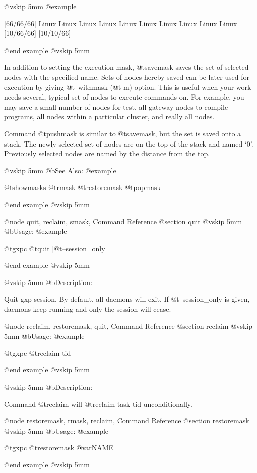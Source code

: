 @vskip 5mm
@example

  [66/66/66]%
  Linux
  Linux
  Linux
  Linux
  Linux
  Linux
  Linux
  Linux
  Linux
  Linux
  [10/66/66]%
  [10/10/66]%

@end example
@vskip 5mm

In addition to setting the execution mask, @t{savemask} saves the set
of selected nodes with the specified name. Sets of nodes hereby
saved can be later used for execution by giving @t{--withmask} (@t{-m})
option. This is useful when your work needs several, typical set
of nodes to execute commands on. For example, you may save a
small number of nodes for test, all gateway nodes to compile
programs, all nodes within a particular cluster, and really all
nodes.

Command @t{pushmask} is similar to @t{savemask}, but the set is saved
onto a stack. The newly selected set of nodes are on the top of
the stack and named `0'.  Previously selected nodes are named by
the distance from the top.

@vskip 5mm
@b{See Also:}
@example

  @t{showmasks} @t{rmask} @t{restoremask} @t{popmask}

@end example
@vskip 5mm

@node quit, reclaim, smask, Command Reference
@section quit
@vskip 5mm
@b{Usage:}
@example

  @t{gxpc} @t{quit} [@t{--session_only}]

@end example
@vskip 5mm

@vskip 5mm
@b{Description:}


  Quit gxp session. By default, all daemons will exit.
If @t{--session_only} is given, daemons keep running and only the 
session will cease.

@node reclaim, restoremask, quit, Command Reference
@section reclaim
@vskip 5mm
@b{Usage:}
@example

  @t{gxpc} @t{reclaim} tid

@end example
@vskip 5mm

@vskip 5mm
@b{Description:}


  Command @t{reclaim} will @t{reclaim} task tid unconditionally.

@node restoremask, rmask, reclaim, Command Reference
@section restoremask
@vskip 5mm
@b{Usage:}
@example

  @t{gxpc} @t{restoremask} @var{NAME}

@end example
@vskip 5mm

